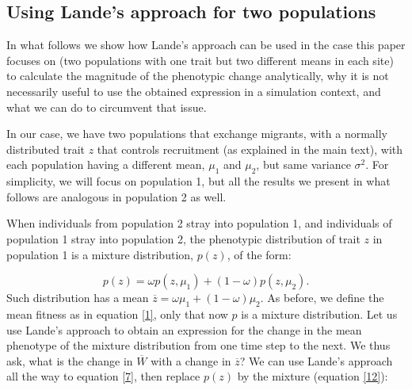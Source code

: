 \documentclass[a4paper]{article}
\begin{document}
\subsection{Using Lande's approach for two populations}
In what follows we show how Lande's approach can be used in the case this paper focuses on (two populations with one trait but two different means in each site) to calculate the magnitude of the phenotypic change analytically, why it is not necessarily useful to use the obtained expression in a simulation context, and what we can do to circumvent that issue.

In our case, we have two populations that exchange migrants, with a normally distributed trait $z$ that controls recruitment (as explained in the main text), with each population having a different mean, $\mu_{1}$ and $\mu_{2}$, but same variance $\sigma^{2}$. For simplicity, we will focus on population 1, but all the results we present in what follows are analogous in population 2 as well.

When individuals from population 2 stray into population 1, and individuals of population 1 stray into population 2, the phenotypic distribution of trait $z$ in population 1 is a mixture distribution, $p(z)$, of the form:

\begin{equation}\label{12}
p(z)=\omega p(z,\mu_{1})+(1-\omega)p(z,\mu_{2}).
\end{equation}
Such distribution has a mean $\overline{z}=\omega \mu_{1}+(1-\omega)\mu_{2}$. As before, we define the mean fitness as in equation \ref{1}, only that now $p$ is a mixture distribution. Let us use Lande's approach to obtain an expression for the change in the mean phenotype of the mixture distribution from one time step to the next. We thus ask, what is the change in $\overline{W}$ with a change in $\overline{z}$? We can use Lande's approach all the way to equation \ref{7}, then replace $p(z)$ by the mixture (equation \ref{12}): 
\end{document}
